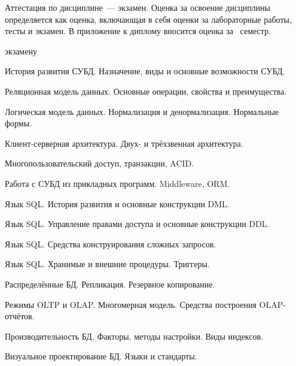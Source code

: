 \documentclass[a4paper]{article}
\begin{document}
\begin{CourseMarkCriteria}
\end{CourseMarkCriteria}

Аттестация по дисциплине~— экзамен.
Оценка за освоение дисциплины определяется как оценка, включающая в себя оценки за лабораторные работы, тесты и экзамен.
В приложение к диплому вносится оценка за \CourseExamSemester\ семестр.

\CourseControlSection

\begin{CourseControlQuestions}{экзамену}
\item История развития СУБД. Назначение, виды и основные возможности СУБД.
\item Реляционная модель данных. Основные операции, свойства и преимущества.
\item Логическая модель данных. Нормализация и денормализация. Нормальные формы.
\item Клиент-серверная архитектура. Двух- и трёхзвенная архитектура.
\item Многопользовательский доступ, транзакции, ACID.
\item Работа с СУБД из прикладных программ. Middleware, ORM.
\item Язык SQL. История развития и основные конструкции DML.
\item Язык SQL. Управление правами доступа и основные конструкции DDL.
\item Язык SQL. Средства конструирования сложных запросов.
\item Язык SQL. Хранимые и внешние процедуры. Триггеры.
\item Распределённые БД. Репликация. Резервное копирование.
\item Режимы OLTP и OLAP. Многомерная модель. Средства построения OLAP-отчётов.
\item Производительность БД. Факторы, методы настройки. Виды индексов.
\item Визуальное проектирование БД. Языки и стандарты.
\end{CourseControlQuestions}

\CourseWorksSection
\end{document}
